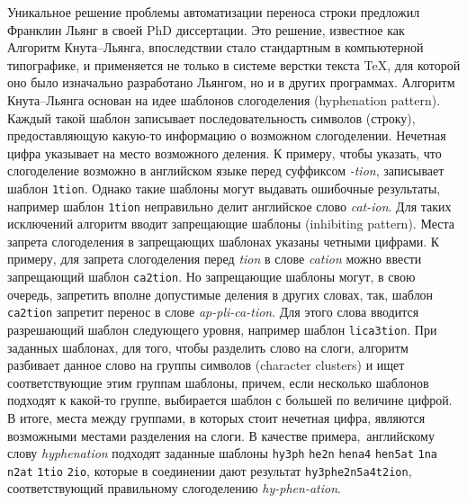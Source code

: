 \documentclass[12pt,a4paper,oneside]{extarticle}
\begin{document}
Уникальное решение проблемы автоматизации переноса строки предложил Франклин Льянг в своей PhD диссертации\autocite[][]{liang1983}. Это решение, известное как Алгоритм Кнута--Льянга, впоследствии стало стандартным в компьютерной типографике, и применяется не только в системе верстки текста \TeX{}, для которой оно было изначально разработано Льянгом, но и в других программах\autocite[Первое описание системы \TeX{} см. ][]{knuth1979}. Алгоритм Кнута--Льянга основан на идее шаблонов слогоделения (\textenglish{hyphenation pattern}). Каждый такой шаблон записывает последовательность символов (строку), предоставляющую какую-то информацию о возможном слогоделении. Нечетная цифра указывает на место возможного деления. К примеру, чтобы указать, что слогоделение возможно в английском языке перед суффиксом \emph{-tion}, записывает шаблон \verb+1tion+. Однако такие шаблоны могут выдавать ошибочные результаты, например шаблон \verb+1tion+ неправильно делит английское слово \emph{cat-ion}. Для таких исключений алгоритм вводит запрещающие шаблоны (\textenglish{inhibiting pattern}). Места запрета слогоделения в запрещающих шаблонах указаны четными цифрами. К примеру, для запрета слогоделения перед \emph{tion} в слове \emph{cation} можно ввести запрещающий шаблон \verb+ca2tion+. Но запрещающие шаблоны могут, в свою очередь, запретить вполне допустимые деления в других словах, так, шаблон \verb+ca2tion+ запретит перенос в слове \emph{ap-pli-ca-tion}. Для этого слова вводится разрешающий шаблон следующего уровня, например шаблон \verb+lica3tion+. При заданных шаблонах, для того, чтобы разделить слово на слоги, алгоритм разбивает данное слово на группы символов (\textenglish{character clusters}) и ищет соответствующие этим группам шаблоны, причем, если несколько шаблонов подходят к какой-то группе, выбирается шаблон с большей по величине цифрой. В итоге, места между группами, в которых стоит нечетная цифра, являются возможными местами разделения на слоги. В качестве примера, английскому слову \emph{hyphenation} подходят заданные шаблоны \verb+hy3ph+ \verb+he2n+ \verb+hena4+ \verb+hen5at+ \verb+1na+ \verb+n2at+ \verb+1tio+ \verb+2io+, которые в соединении дают результат \verb+hy3phe2n5a4t2ion+, соответствующий правильному слогоделению \emph{hy-phen-ation}\autocite[См. подробнее ][pp.~5--6, 35--40.]{liang1983}. 
\end{document}
